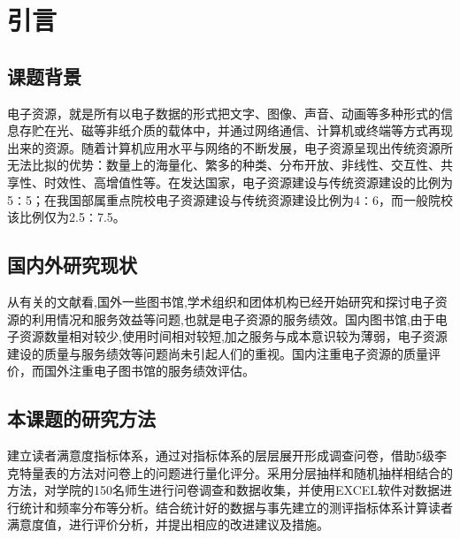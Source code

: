 \section{引言}
    \subsection{课题背景}
        电子资源，就是所有以电子数据的形式把文字、图像、声音、动画等多种形式的信息存贮在光、磁等非纸介质的载体中，并通过网络通信、计算机或终端等方式再现出来的资源。随着计算机应用水平与网络的不断发展，电子资源呈现出传统资源所无法比拟的优势：数量上的海量化、繁多的种类、分布开放、非线性、交互性、共享性、时效性、高增值性等。在发达国家，电子资源建设与传统资源建设的比例为5∶5；在我国部属重点院校电子资源建设与传统资源建设比例为4∶6，而一般院校该比例仅为2.5∶7.5。
    \subsection{国内外研究现状}
        从有关的文献看,国外一些图书馆,学术组织和团体机构已经开始研究和探讨电子资源的利用情况和服务效益等问题,也就是电子资源的服务绩效。国内图书馆,由于电子资源数量相对较少,使用时间相对较短,加之服务与成本意识较为薄弱，电子资源建设的质量与服务绩效等问题尚未引起人们的重视。国内注重电子资源的质量评价，而国外注重电子图书馆的服务绩效评估。
    \subsection{本课题的研究方法}
        建立读者满意度指标体系，通过对指标体系的层层展开形成调查问卷，借助5级李克特量表的方法对问卷上的问题进行量化评分。采用分层抽样和随机抽样相结合的方法，对学院的150名师生进行问卷调查和数据收集，并使用EXCEL软件对数据进行统计和频率分布等分析。结合统计好的数据与事先建立的测评指标体系计算读者满意度值，进行评价分析，并提出相应的改进建议及措施。